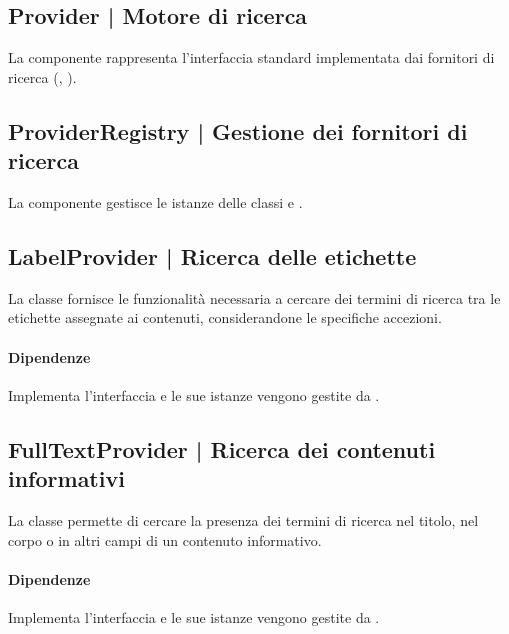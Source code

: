 \documentclass[10pt,a4paper,headinclude,footinclude,hidelinks]{scrreprt} %
\begin{document}
	\subsection[Provider]{Provider | Motore di ricerca}
	\label{sec:stage:design:sistema:model.search:search-provider}
	La componente rappresenta l'interfaccia standard implementata dai fornitori di ricerca (\textit{}, \textit{}).

	\subsection[ProviderRegistry]{ProviderRegistry | Gestione dei fornitori di ricerca}
	\label{sec:stage:design:sistema:model.search:provider-registry}
	La componente gestisce le istanze delle classi \textit{} e \textit{}.

	\subsection[LabelProvider]{LabelProvider | Ricerca delle etichette}
	\label{sec:stage:design:sistema:model.search:tag-provider}
	La classe fornisce le funzionalità necessaria a cercare dei termini di ricerca tra le etichette assegnate ai contenuti, considerandone le specifiche accezioni.

	\paragraph{Dipendenze} Implementa l'interfaccia \textit{} e le sue istanze vengono gestite da \textit{}.

	\subsection[FullTextProvider]{FullTextProvider | Ricerca dei contenuti informativi}
	\label{sec:stage:design:sistema:model.search:full-text-provider}
	La classe permette di cercare la presenza dei termini di ricerca nel titolo, nel corpo o in altri campi di un contenuto informativo.

	\paragraph{Dipendenze} Implementa l'interfaccia \textit{} e le sue istanze vengono gestite da \textit{}.
\end{document}
